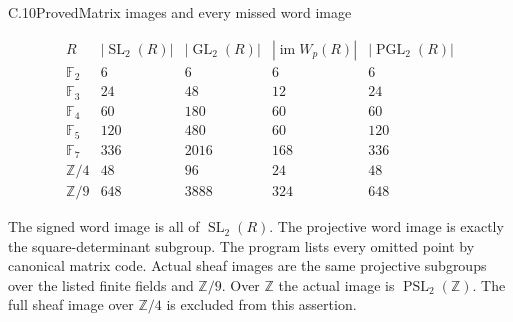 \begin{statement}{C.10}{Proved}{Matrix images and every missed word image}

$$
\begin{array}{c|rrrr}
R&|\operatorname{SL}_2(R)|&|\operatorname{GL}_2(R)|&
|\operatorname{im}W_p(R)|&|\operatorname{PGL}_2(R)|\\\hline
\mathbb F_2&6&6&6&6\\
\mathbb F_3&24&48&12&24\\
\mathbb F_4&60&180&60&60\\
\mathbb F_5&120&480&60&120\\
\mathbb F_7&336&2016&168&336\\
\mathbb Z/4&48&96&24&48\\
\mathbb Z/9&648&3888&324&648
\end{array}
$$

The signed word image is all of $\operatorname{SL}_2(R)$.
The projective word image is exactly the square-determinant
subgroup. The program lists every omitted point by canonical
matrix code. Actual sheaf images are the same projective
subgroups over the listed finite fields and $\mathbb Z/9$.
Over $\mathbb Z$ the actual image is
$\operatorname{PSL}_2(\mathbb Z)$. The full sheaf image over
$\mathbb Z/4$ is excluded from this assertion.
\end{statement}
